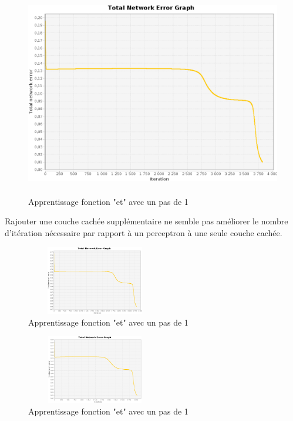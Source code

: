 \documentclass[twoside,openright,a4paper,11pt,french]{article}
\begin{document}
\begin{figure}[h]
\centering
\includegraphics[width=12cm,height=9cm]{./pics/eq/multi_3_3_def.eps}
\caption{Apprentissage fonction "et" avec un pas de 1}
\label{fig:anderr4}
\end{figure}


Rajouter une couche cachée supplémentaire ne semble pas améliorer le nombre d'itération
nécessaire par rapport à un perceptron à une seule couche cachée.

\begin{figure}[h]
\includegraphics[width=6cm,height=3cm]{./pics/eq/multi_3_3_def.eps}
\caption{Apprentissage fonction "et" avec un pas de 1}
\label{fig:anderr4}
\end{figure}

\begin{figure}[h]
\includegraphics[width=6cm,height=3cm]{./pics/eq/multi_4_4_def.eps}
\caption{Apprentissage fonction "et" avec un pas de 1}
\label{fig:anderr4}
\end{figure}
\end{document}
